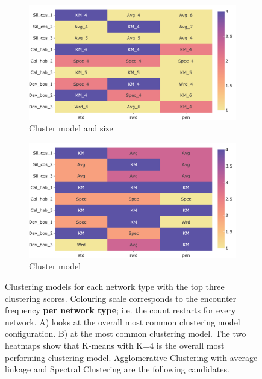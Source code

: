 \begin{figure}[!htb]
    \centering
    \begin{subfigure}[!t]{0.8\textwidth}
        \includegraphics[width=\textwidth,keepaspectratio]{Sections/Network_I/Resources/P0/clustering/top3_cs_gen_p0_tum4K_50TF_v3.png}    
        \caption{Cluster model and size}
        \label{fig:N_I:p0_metr_model_size}
    \end{subfigure}
    \begin{subfigure}[!t]{0.8\textwidth}
        \includegraphics[width=\textwidth,keepaspectratio]{Sections/Network_I/Resources/P0/clustering/top3_cs_model_p0_tum4K_50TF_v3.png}
        \caption{Cluster model}
        \label{fig:N_I:p0_metr_model}
    \end{subfigure} 
    \caption[Heatmap: choosing clustering model for P0 mevs]{Clustering models for each network type with the top three clustering scores. Colouring scale corresponds to the encounter frequency \textbf{per network type}; i.e. the count restarts for every network. A) looks at the overall most common clustering model configuration. B) at the most common clustering model. The two heatmaps show that K-means with K=4 is the overall most performing clustering model. Agglomerative Clustering with average linkage and Spectral Clustering are the following candidates.}
    \label{fig:N_I:p0_top_3_metrics_I}
\end{figure}

